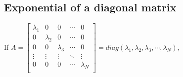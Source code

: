 \documentclass[letterpaper,10pt,english]{jupyterBook}
\begin{document}
\subsection{Exponential of a diagonal matrix}
\label{\detokenize{appendix:exponential-of-a-diagonal-matrix}}
\sphinxAtStartPar
If \(A =   
\left[ {\begin{array}{ccccc}
    \lambda_1 & 0 & 0 & \dotsm & 0\\
    0 & \lambda_2 & 0 & \dotsm & 0\\
    0 & 0 & \lambda_3 & \dotsm & 0\\
    \vdots & \vdots & \vdots & \ddots & \vdots\\
    0 & 0 & 0 & \dotsm & \lambda_{N}\\
\end{array} } \right] 
  = diag(\lambda_1, \lambda_2, \lambda_3, \dotsm, \lambda_N)\),
\end{document}
